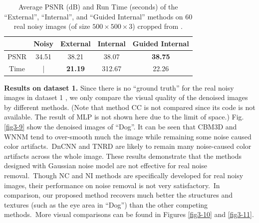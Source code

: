 \begin{table}\vspace{-4mm}
\caption{Average PSNR (dB) and Run Time (seconds) of the ``External'', ``Internal'', and ``Guided Internal'' methods on 60 real noisy images (of size $500\times500\times3$) cropped from \cite{crosschannel2016}.}
\vspace{-4mm}
\label{tab3-1}
\begin{center}
\renewcommand\arraystretch{1}
\begin{tabular}{|c||c|c|c|c|}
\hline
 & \small\textbf{Noisy} &\small \textbf{External} & \small\textbf{Internal} & \small\textbf{Guided Internal}  
\\
\hline
PSNR & 34.51 & 38.21 & 38.07 & \textbf{38.75} 
\\
\hline
Time & | &  \textbf{21.19}  & 312.67 & 22.26
\\
\hline
\end{tabular}
\end{center}
\vspace{-3mm}
\end{table}

\textbf{Results on dataset 1.}
Since there is no ``ground truth'' for the real noisy images in  dataset 1 \cite{ncwebsite}, we only compare the visual quality of the denoised images by different methods. (Note that method CC \cite{crosschannel2016} is not compared since its code is not available. The result of MLP is not shown here due to the limit of space.) Fig. \ref{fig3-9} show the denoised images of ``Dog''. It can be seen that CBM3D and WNNM tend to over-smooth much the image while remaining some noise caused color artifacts.\ DnCNN and TNRD are likely to remain many noise-caused color artifacts across the whole image. These results demonstrate that the methods designed with Gaussian noise model are not effective for real noise removal.\ Though NC and NI methods are specifically developed for real noisy images, their performance on noise removal is not very satisfactory.\ In comparison, our proposed method recovers much better the structures and textures (such as the eye area in ``Dog'') than the other competing methods.\ More visual comparisons can be found in Figures \ref{fig3-10} and \ref{fig3-11}.


